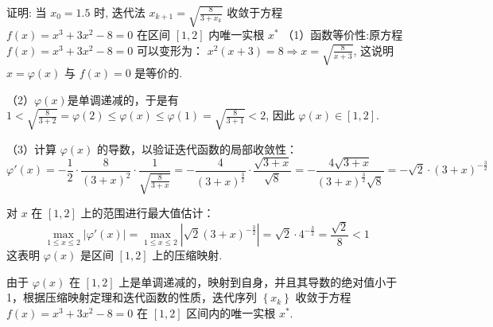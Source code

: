 \begin{tcolorbox}[enhanced,colback=10,colframe=9,breakable,coltitle=green!25!black,title=2024]
  
证明: 当 $ x_{0}=1.5 $ 时, 迭代法 $ {x}_{{k}+1}=\sqrt{\frac{8}{3+{x}_{{k}}}} $ 收敛于方程 $ f(x)=x^{3}+3 x^{2}-8=0 $ 在区间 $ [1,2] $ 内唯一实根 $ x^{*} $
\tcblower
（1）函数等价性:原方程 \( f(x) = x^3 + 3x^2 - 8 = 0 \) 可以变形为：
 $x^2(x + 3) = 8 \Rightarrow x = \sqrt{\frac{8}{x + 3}}$,
这说明 \( x = \varphi(x) \) 与 \( f(x) = 0 \) 是等价的.

 （2）$\varphi(x)$是单调递减的，于是有 $1<\sqrt{\frac{8}{3+2}}=\varphi(2) \leqslant \varphi(x) \leqslant \varphi(1)=\sqrt{\frac{8}{3+1}}<2 $, 因此 $\varphi(x) \in[1,2]$.


 （3）计算 \( \varphi(x) \) 的导数，以验证迭代函数的局部收敛性：
\[ \varphi'(x) = -\frac{1}{2} \cdot \frac{8}{(3+x)^2} \cdot \frac{1}{\sqrt{\frac{8}{3+x}}}= -\frac{4}{(3+x)^{\frac{3}{2}}} \cdot \frac{\sqrt{3+x}}{\sqrt{8}} = -\frac{4 \sqrt{3+x}}{(3+x)^{\frac{3}{2}} \sqrt{8}} = -\sqrt{2} \cdot (3+x)^{-\frac{3}{2}} \]

对 \( x \) 在 \([1, 2]\) 上的范围进行最大值估计：
\[ \max_{1 \leqslant x \leqslant 2} |\varphi'(x)| = \max_{1 \leqslant x \leqslant 2} \left|\sqrt{2}(3+x)^{-\frac{3}{2}}\right| = \sqrt{2} \cdot 4^{-\frac{3}{2}} = \frac{\sqrt{2}}{8}<1 \]
这表明 \( \varphi(x) \) 是区间 \([1, 2]\) 上的压缩映射.

由于 \( \varphi(x) \) 在 \([1, 2]\) 上是单调递减的，映射到自身，并且其导数的绝对值小于 1，根据压缩映射定理和迭代函数的性质，迭代序列 \( \left\{x_k\right\} \) 收敛于方程 \( f(x) = x^3 + 3x^2 - 8 = 0 \) 在 \([1, 2]\) 区间内的唯一实根 \( x^* \).
\end{tcolorbox}

